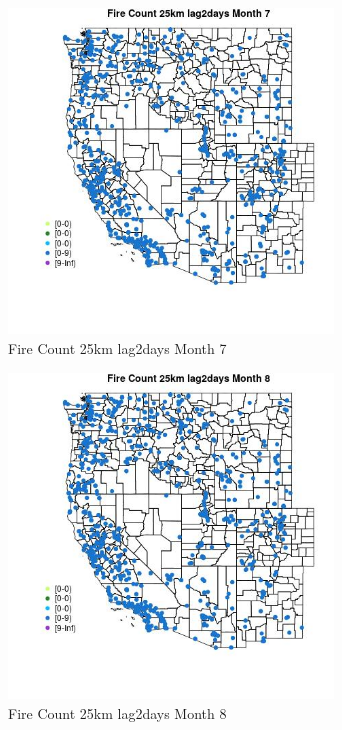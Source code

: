 \begin{figure} 
\centering  
\includegraphics[width=0.77\textwidth]{Code_Outputs/Report_ML_input_PM25_Step4_part_e_de_duplicated_aves_compiled_2019-05-21wNAs_MapObsMo7Fire_Count_25km_lag2days.jpg} 
\caption{\label{fig:Report_ML_input_PM25_Step4_part_e_de_duplicated_aves_compiled_2019-05-21wNAsMapObsMo7Fire_Count_25km_lag2days}Fire Count 25km lag2days Month 7} 
\end{figure} 
 

\begin{figure} 
\centering  
\includegraphics[width=0.77\textwidth]{Code_Outputs/Report_ML_input_PM25_Step4_part_e_de_duplicated_aves_compiled_2019-05-21wNAs_MapObsMo8Fire_Count_25km_lag2days.jpg} 
\caption{\label{fig:Report_ML_input_PM25_Step4_part_e_de_duplicated_aves_compiled_2019-05-21wNAsMapObsMo8Fire_Count_25km_lag2days}Fire Count 25km lag2days Month 8} 
\end{figure} 
 

